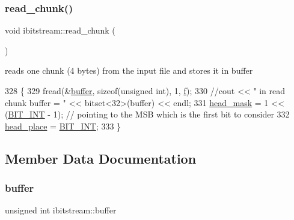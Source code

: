 \mbox{\label{classibitstream_ac62c26004436d83f337f4aeba0895e20}} 
\subsubsection{\texorpdfstring{read\+\_\+chunk()}{read\_chunk()}}
{\footnotesize\ttfamily void ibitstream\+::read\+\_\+chunk (\begin{DoxyParamCaption}{ }\end{DoxyParamCaption})}



reads one chunk (4 bytes) from the input file and stores it in buffer 


\begin{DoxyCode}
328                            \{
329   fread(&\hyperlink{classibitstream_a73f0b24d3d4402369f1abbb43f7f70ef}{buffer}, \textcolor{keyword}{sizeof}(\textcolor{keywordtype}{unsigned} \textcolor{keywordtype}{int}), 1, \hyperlink{classibitstream_a3ea2cdd0cf97820f0e1520c42e364308}{f});
330   \textcolor{comment}{//cout << " in read chunk  buffer = " << bitset<32>(buffer) << endl;}
331   \hyperlink{classibitstream_a48cd41991b6c29ea5120b53873a72a70}{head\_mask} = 1 << (\hyperlink{bitstream_8h_afcadf5aa65c5159bfb96c4d82ebc0a5d}{BIT\_INT} - 1); \textcolor{comment}{// pointing to the MSB which is the first bit to consider}
332   \hyperlink{classibitstream_a7b96359ac1534a5565e6e9b0cc53a0b3}{head\_place} = \hyperlink{bitstream_8h_afcadf5aa65c5159bfb96c4d82ebc0a5d}{BIT\_INT};
333 \}
\end{DoxyCode}


\subsection{Member Data Documentation}
\mbox{\label{classibitstream_a73f0b24d3d4402369f1abbb43f7f70ef}} 
\subsubsection{\texorpdfstring{buffer}{buffer}}
{\footnotesize\ttfamily unsigned int ibitstream\+::buffer\hspace{0.3cm}{\ttfamily [private]}}



